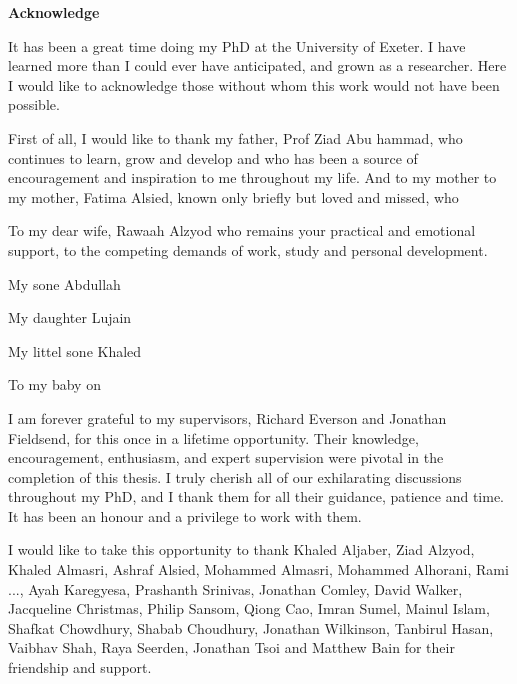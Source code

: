   \vspace{5 cm}



     
   \begin{center}

 \textbf{Acknowledge} 
\end{center}

It has been a great time doing my PhD at the University of Exeter. I have learned
more than I could ever have anticipated, and grown as a researcher. Here I would like to
acknowledge those without whom this work would not have been possible.

First of all, I would like to thank my father, Prof Ziad Abu hammad, who continues to learn, grow and develop and who has been a
source of encouragement and inspiration to me throughout my life. And to my mother to my mother, Fatima Alsied, known only briefly but loved and missed, who

To my dear wife, Rawaah Alzyod who remains your practical and emotional support, to the competing demands of  work, study and
personal development.

My sone Abdullah

My daughter  Lujain

My littel sone Khaled

To my baby on 

I am forever grateful to my supervisors, Richard Everson and Jonathan Fieldsend, for
this once in a lifetime opportunity. Their knowledge, encouragement, enthusiasm, and
expert supervision were pivotal in the completion of this thesis. I truly cherish all of our
exhilarating discussions throughout my PhD, and I thank them for all their guidance,
patience and time. It has been an honour and a privilege to work with them.

I would like to take this opportunity to thank Khaled Aljaber, Ziad Alzyod,
Khaled Almasri, Ashraf Alsied, Mohammed Almasri, Mohammed Alhorani, Rami ..., Ayah
Karegyesa, Prashanth Srinivas, Jonathan Comley, David Walker, Jacqueline Christmas,
Philip Sansom, Qiong Cao, Imran Sumel, Mainul Islam, Shafkat Chowdhury, Shabab
Choudhury, Jonathan Wilkinson, Tanbirul Hasan, Vaibhav Shah, Raya Seerden, Jonathan
Tsoi and Matthew Bain for their friendship and support.
